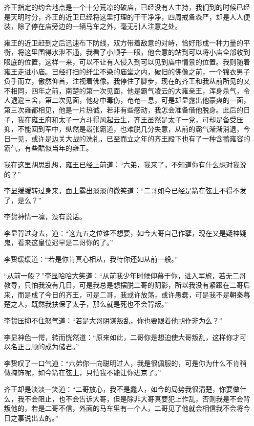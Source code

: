 齐王指定的约会地点是一个十分荒凉的破庙，已经没有人主持，我们到的时候已经是天明时分，齐王的近卫已经将这里打理的干干净净，四周戒备森严，却是人人便装，除了停在庙旁边的一辆马车之外，毫无引人注意之处。

雍王的近卫赶到之后迅速布下防线，双方带着敌意的对峙，恰好形成一种力量的平衡，将这里围得水泄不通，我看了小顺子一眼，他会意的站到可以将小庙全部收到眼底的位置，这样一来，可以不让有人侵入到可以见到庙中情景的位置。我则随着雍王走进小庙。已经打扫的纤尘不染的庙堂之内，破旧的佛像之前，一个锦衣男子负手而立，傲然仰首，注视着佛像。我停住了脚步，现在的齐王和我从前所见的又不相同，四年之前，南楚的第一次见面，他是霸气凌云的大雍亲王，浑身杀气，令人退避三舍，第二次见面，他身中毒伤，奄奄一息，可是却显露出他豪爽的一面，第三次雍都相见，他是一片热诚，若非有些感动，我怎会准备借他脱身。此后的日子，我在雍王府和太子一方斗得风起云生，齐王虽然是太子一党，可却是备受压抑，不能回到军中，纵然是嚣张霸道，也难脱几分失意，从前的霸气渐渐消退，今日一见，或许是边关大战的洗礼，已至而立之年的齐王殿下也有了一种含蓄雍容的霸气，有些酷似当年的雍王。

我在这里胡思乱想，雍王已经上前道：“六弟，我来了，不知道你有什么想对我说的？”

李显缓缓转过身来，面上露出淡淡的微笑道：“二哥如今已经是箭在弦上不得不发了，是么？”

李贽神情一凛，没有说话。

李显背过身去，道：“这九五之位谁不想要，如今大哥自己作孽，现在又是疑神疑鬼，看来这皇位迟早是二哥你的了。”

李贽缓缓道：“若是你肯真心相从，我待你还如从前一般。”

“从前一般？”李显哈哈大笑道：“从前我少年时候仰慕于你，进入军旅，若无二哥教导，只怕我没有几日，可是我总是想摆脱二哥的阴影，所以我没有紧跟在二哥后来，而是成了今日的齐王，可是二哥，我或许放荡，或许愚蠢，可是我不是朝秦暮楚之人，既然我扶保了太子，那么就是死也不会背叛。”

李贽压抑不住怒气道：“若是大哥阴谋叛乱，你也要跟着他胡作非为么？”

李显神色一愕，转而恍然道：“原来如此，二哥你是想迫使大哥叛乱，这样你才可以名正言顺的成为储君。”

李贽叹了一口气道：“六弟你一向聪明过人，我是很佩服的，可是你为什么不肯稍做掩饰呢，如今箭在弦上，只怕我不能让你进京了。”

齐王却是淡淡一笑道：“二哥放心，我不是蠢人，如今的局势我很清楚，你要做什么，我不会阻止，也不会告诉大哥，但是除非大哥真要犯上作乱，否则我是不会背叛他的，若是二哥不信，外面的马车里有一个人，二哥见了他就会相信我不会将今日之事说出去的。”

